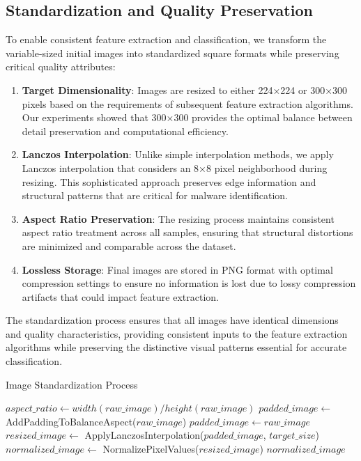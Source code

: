 \subsection{Standardization and Quality Preservation}
\label{subsec:standardization}

To enable consistent feature extraction and classification, we transform the variable-sized initial images into standardized square formats while preserving critical quality attributes:

\begin{enumerate}
    \item \textbf{Target Dimensionality}: Images are resized to either 224×224 or 300×300 pixels based on the requirements of subsequent feature extraction algorithms. Our experiments showed that 300×300 provides the optimal balance between detail preservation and computational efficiency.
    
    \item \textbf{Lanczos Interpolation}: Unlike simple interpolation methods, we apply Lanczos interpolation that considers an 8×8 pixel neighborhood during resizing. This sophisticated approach preserves edge information and structural patterns that are critical for malware identification.
    
    \item \textbf{Aspect Ratio Preservation}: The resizing process maintains consistent aspect ratio treatment across all samples, ensuring that structural distortions are minimized and comparable across the dataset.
    
    \item \textbf{Lossless Storage}: Final images are stored in PNG format with optimal compression settings to ensure no information is lost due to lossy compression artifacts that could impact feature extraction.
\end{enumerate}

The standardization process ensures that all images have identical dimensions and quality characteristics, providing consistent inputs to the feature extraction algorithms while preserving the distinctive visual patterns essential for accurate classification.

\begin{algorithm}[!htbp]
\caption{Image Standardization Process}
\label{alg:image-standardization}
\begin{algorithmic}[1]
    \State $aspect\_ratio \leftarrow width(raw\_image) / height(raw\_image)$
        \State $padded\_image \leftarrow$ AddPaddingToBalanceAspect($raw\_image$)
    \Else
        \State $padded\_image \leftarrow raw\_image$
    \EndIf
    \State $resized\_image \leftarrow$ ApplyLanczosInterpolation($padded\_image$, $target\_size$)
    \State $normalized\_image \leftarrow$ NormalizePixelValues($resized\_image$)
    \Return $normalized\_image$
\EndProcedure
\end{algorithmic}
\end{algorithm}

